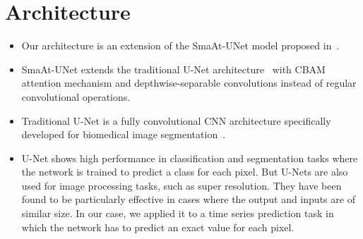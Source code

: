 \documentclass[a4paper,11pt,oneside]{report}
\begin{document}
\section{Architecture}\label{sec:model}
\begin{itemize}
    \item Our architecture is an extension of the SmaAt-UNet model proposed in~\cite{smatunet}.
     \item SmaAt-UNet extends the traditional U-Net architecture~\cite{unet} with CBAM attention mechanism and depthwise-separable convolutions instead of regular convolutional operations. 
    \item Traditional U-Net is a fully convolutional CNN architecture specifically developed for biomedical image segmentation~\cite{Ronneberger2015}. 
    \item U-Net shows high performance in classification and segmentation tasks where the network is trained to predict a class for each pixel. But U-Nets are also used for image processing tasks, such as super resolution. They have been found to be particularly effective in cases where the output and inputs are of similar size. In our case, we applied it to a time series prediction task in which the network has to predict an exact value for each pixel.


\end{itemize}
\end{document}
